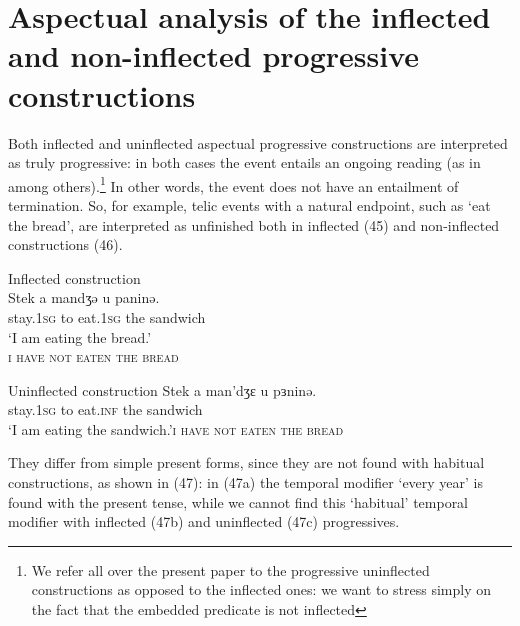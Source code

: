 \documentclass[output=paper]{langsci/langscibook}
\begin{document}
\section{Aspectual analysis of the inflected and non-inflected progressive constructions}%
Both inflected and uninflected aspectual progressive constructions are interpreted as truly progressive: in both cases the event entails an ongoing reading (as in \citealt{Arosio2011} among others).\footnote{We refer all over the present paper to the progressive uninflected constructions as opposed to the inflected ones: we want to stress simply on the fact that the embedded predicate is not inflected} In other words, the event does not have an entailment of termination. So, for example, telic events with a natural endpoint, such as ‘eat the bread’, are interpreted as unfinished both in inflected (45) and non-inflected constructions (46). 

\ea%
         Inflected construction\label{ex:lorusso:45}\\
    \gll Stek     a  mandʒə   u  paninə. \\
         stay.\textsc{1sg} to  eat.\textsc{1sg} the   sandwich \\
    \glt ‘I am eating the bread.’\\\textsc{i have not eaten the bread}
\z



\ea%
         Uninflected construction\label{ex:lorusso:46}
    \gll Stek     a  man’dʒɛ  u  pɜninə.     \\
         stay.\textsc{1sg} to  eat.\textsc{inf} the   sandwich \\
    \glt ‘I am eating the sandwich.’\textsc{i have not eaten the bread}
\z 

They differ from simple present forms, since they are not found with habitual constructions, as shown in (47): in (47a) the temporal modifier ‘every year’ is found with the present tense, while we cannot find this ‘habitual’ temporal modifier with inflected (47b) and uninflected (47c) progressives.

\ea%
    \label{ex:lorusso:47}
    \z
\z
\end{document}
